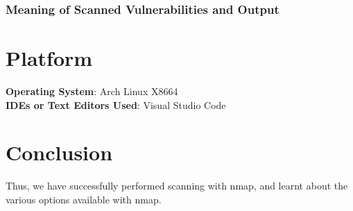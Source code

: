 \documentclass[11pt]{article}
\begin{document}
\subsubsection*{Meaning of Scanned Vulnerabilities and Output}


\section{Platform}
\textbf{Operating System}: Arch Linux X8664 \\
\textbf{IDEs or Text Editors Used}: Visual Studio Code\\

% 

\section{Conclusion}
Thus, we have successfully performed scanning with nmap, and learnt about the various options available with nmap.

\clearpage

\pagebreak
\end{document}
